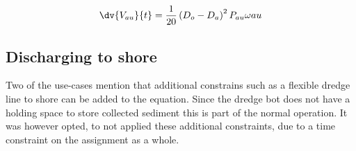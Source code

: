 \begin{sBox}
	\begin{equation}\label{eq:SIaugerflow}
	\dv{V_{au}}{t} = \frac{1}{20} \left(D_{o} - D_{a}\right)^2 P_{au} \omega{au}
	\end{equation}
\end{sBox}

\subsection{Discharging to shore}
\begin{note}
Two of the use-cases mention that additional constrains such as a flexible dredge line to shore can be added to the equation. Since the dredge bot does not have a holding space to store collected sediment this is part of the normal operation. It was however opted, to not applied these additional constraints, due to a time constraint on the assignment as a whole.
\end{note}
